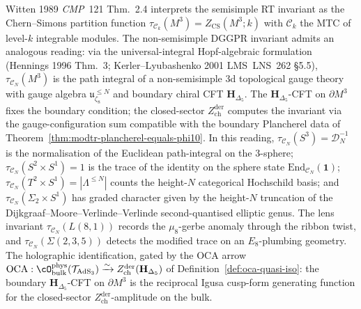 \begin{remark}
\label{rem:modtr-rt-gravity-reading}
Witten 1989 \emph{CMP}~121 Thm.~2.4 interprets the semisimple
RT invariant as the Chern--Simons partition function
$\tau_{\mathcal C_k}(M^3) = Z_{\mathrm{CS}}(M^3; k)$ with
$\mathcal C_k$ the MTC of level-$k$ integrable modules. The
non-semisimple DGGPR invariant admits an analogous reading: via
the universal-integral Hopf-algebraic formulation
(Hennings 1996 Thm.~3; Kerler--Lyubashenko 2001 LMS~LNS~262 \S 5.5),
\(\tau_{\mathcal C_N}(M^3)\) is the path integral of a non-semisimple
3d topological gauge theory with gauge algebra
\(\mathfrak u_{\zeta_8}^{\leq N}\)
and boundary chiral CFT $\mathbf H_{\Delta_5}$. The
$\mathbf H_{\Delta_5}$-CFT on $\partial M^3$ fixes the boundary
condition; the closed-sector $Z^{\mathrm{der}}_{\mathrm{ch}}$
computes the invariant via the gauge-configuration sum compatible
with the boundary Plancherel data of
Theorem~\ref{thm:modtr-plancherel-equals-phi10}.
In this reading,
\(\tau_{\mathcal C_N}(S^3) = \mathcal D_N^{-1}\) is the
normalisation of the Euclidean path-integral on the \(3\)-sphere;
\(\tau_{\mathcal C_N}(S^2\!\times\!S^1)=1\) is the trace of the
identity on the sphere state \(\mathrm{End}_{\mathcal C_N}(\mathbf 1)\);
\(\tau_{\mathcal C_N}(T^2\!\times\!S^1)=|\Lambda^{\leq N}|\) counts
the height-\(N\) categorical Hochschild basis; and
\(\tau_{\mathcal C_N}(\Sigma_2\!\times\!S^1)\) has graded character
given by the height-\(N\) truncation of the
Dijkgraaf--Moore--Verlinde--Verlinde second-quantised elliptic genus.
The lens invariant \(\tau_{\mathcal C_N}(L(8,1))\) records the
\(\mu_8\)-gerbe anomaly through the ribbon twist, and
\(\tau_{\mathcal C_N}(\Sigma(2,3,5))\) detects the modified trace on
an \(E_8\)-plumbing geometry. The holographic identification, gated by the OCA arrow
$\mathrm{OCA}: \cO^{\mathrm{phys}}_{\mathrm{bulk}}(\mathcal T_{\mathrm{AdS}_3}) \xrightarrow{\sim}
Z^{\mathrm{der}}_{\mathrm{ch}}(\mathbf H_{\Delta_5})$ of
Definition~\ref{def:oca-quasi-iso}: the boundary $\mathbf H_{\Delta_5}$-CFT on
$\partial M^3$ is the reciprocal Igusa cusp-form generating function
for the closed-sector $Z^{\mathrm{der}}_{\mathrm{ch}}$-amplitude on the bulk.
\end{remark}

